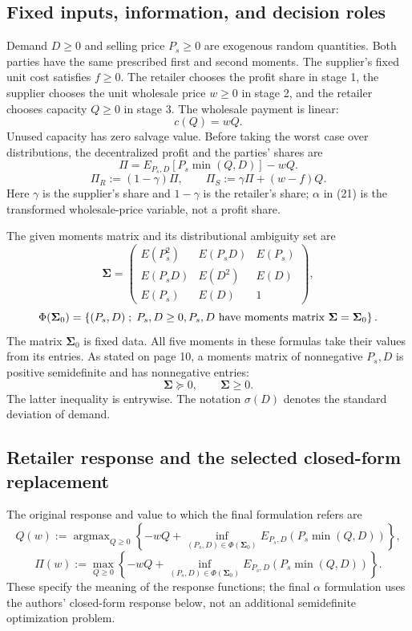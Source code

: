 \documentclass{article}
\begin{document}
\subsection*{Fixed inputs, information, and decision roles}
Demand $D\geq0$ and selling price $P_s\geq0$ are exogenous random quantities. Both parties have the same prescribed first and second moments. The supplier's fixed unit cost satisfies $f\geq0$. The retailer chooses the profit share in stage 1, the supplier chooses the unit wholesale price $w\geq0$ in stage 2, and the retailer chooses capacity $Q\geq0$ in stage 3. The wholesale payment is linear:
\[
c(Q)=wQ.
\]
Unused capacity has zero salvage value. Before taking the worst case over distributions, the decentralized profit and the parties' shares are
\begin{equation}
\Pi=E_{P_s,D}\!\left[P_s\min(Q,D)\right]-wQ.
\tag{2}
\end{equation}
\[
\Pi_R:=(1-\gamma)\Pi,\qquad
\Pi_S:=\gamma\Pi+(w-f)Q.
\]
Here $\gamma$ is the supplier's share and $1-\gamma$ is the retailer's share; $\alpha$ in (21) is the transformed wholesale-price variable, not a profit share.

The given moments matrix and its distributional ambiguity set are
\[
\boldsymbol{\Sigma}=
\begin{pmatrix}
E(P_s^2)&E(P_sD)&E(P_s)\\
E(P_sD)&E(D^2)&E(D)\\
E(P_s)&E(D)&1
\end{pmatrix},
\]
\[
\Phi(\boldsymbol{\Sigma}_0)=
\left\{(P_s,D)\;;\;P_s,D\geq0,\space{}
P_s,D\text{ have moments matrix }\boldsymbol{\Sigma}=\boldsymbol{\Sigma}_0\right\}.
\]
The matrix $\boldsymbol{\Sigma}_0$ is fixed data. All five moments in these formulas take their values from its entries. As stated on page 10, a moments matrix of nonnegative $P_s,D$ is positive semidefinite and has nonnegative entries:
\[
\boldsymbol{\Sigma}\succeq0,\qquad \boldsymbol{\Sigma}\geq0.
\]
The latter inequality is entrywise. The notation $\sigma(D)$ denotes the standard deviation of demand.

\subsection*{Retailer response and the selected closed-form replacement}
The original response and value to which the final formulation refers are
\begin{equation}
Q(w):=\operatorname{argmax}_{Q\geq0}
\left\{-wQ+\inf_{(P_s,D)\in\Phi(\boldsymbol{\Sigma}_0)}
E_{P_s,D}\!\left(P_s\min(Q,D)\right)\right\},
\tag{3}
\end{equation}
\begin{equation}
\Pi(w):=\max_{Q\geq0}
\left\{-wQ+\inf_{(P_s,D)\in\Phi(\boldsymbol{\Sigma}_0)}
E_{P_s,D}\!\left(P_s\min(Q,D)\right)\right\}.
\tag{4}
\end{equation}
These specify the meaning of the response functions; the final $\alpha$ formulation uses the authors' closed-form response below, not an additional semidefinite optimization problem.
\end{document}
